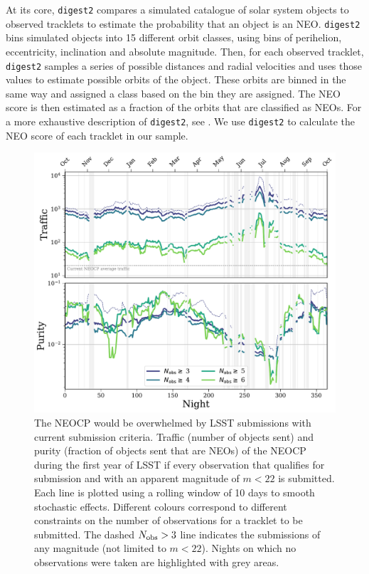 \documentclass[twocolumn]{aastex631}
\newcommand{\dig}{\texttt{digest2}}
\begin{document}
At its core, \dig{} compares a simulated catalogue of solar system objects to observed tracklets to estimate the probability that an object is an NEO. \dig{} bins simulated objects into 15 different orbit classes, using bins of perihelion, eccentricity, inclination and absolute magnitude. Then, for each observed tracklet, \dig{} samples a series of possible distances and radial velocities and uses those values to estimate possible orbits of the object. These orbits are binned in the same way and assigned a class based on the bin they are assigned. The NEO score is then estimated as a fraction of the orbits that are classified as NEOs. For a more exhaustive description of \dig{}, see \citet{Keys+2019}. We use \dig{} to calculate the NEO score of each tracklet in our sample. 
\begin{figure}[htb]
    \centering
    \includegraphics[width=\textwidth]{traffic_purity.pdf}
    \caption{The NEOCP would be overwhelmed by LSST submissions with current submission criteria. Traffic (number of objects sent) and purity (fraction of objects sent that are NEOs) of the NEOCP during the first year of LSST if every observation that qualifies for submission and with an apparent magnitude of $m < 22$ is submitted. Each line is plotted using a rolling window of 10 days to smooth stochastic effects. Different colours correspond to different constraints on the number of observations for a tracklet to be submitted. The dashed $N_{\rm obs} > 3$ line indicates the submissions of any magnitude (not limited to $m < 22$). Nights on which no observations were taken are highlighted with grey areas.}
    \label{fig:neocp_traffic}
\end{figure}
\end{document}
